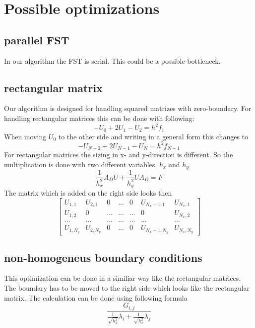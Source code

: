 \documentclass{article}
\begin{document}



\section{Possible optimizations}
\subsection{parallel FST}
In our algorithm the FST is serial. This could be a possible bottleneck.
\subsection{rectangular matrix}
Our algorithm is designed for handling squared matrizes with zero-boundary. For handling rectangular matrices this can be done with following:
\begin{equation}
-U_0+2U_1-U_2=h^2f_1
\end{equation}
When moving $U_0$ to the other side and writing in a general form this changes to
\begin{equation}
-U_{N-2}+2U_{N-1}-U_N=h^2f_{N-1}
\end{equation}
For rectangular matrices the sizing in x- and y-direction is different. So the multiplication is done with two different variables, $h_x$ and $h_y$.
\begin{equation}
\frac{1}{h_x^2}A_DU+\frac{1}{h_y^2}UA_D=F
\end{equation}
The matrix which is added on the right side looks then
$$
\begin{bmatrix}
U_{1,1} & U_{2,1} & 0 & ... & 0 & U_{N_x-1,1} & U_{N_x,1} \\
U_{1,2} & 0 & ... & ... & ... & 0 & U_{N_x,2} \\
... & ... & ... & ... &... & ... & ... \\
U_{1,N_y} & U_{2,N_y} & 0 & ... & 0 & U_{N_x-1,N_y} & U_{N_x,N_y} 
\end{bmatrix}
$$
\subsection{non-homogeneus boundary conditions}
This optimization can be done in a similiar way like the rectangular matrices. The boundary has to be moved to the right side which looks like the rectangular matrix. The calculation can be done using following formula
\begin{equation}
\frac{G_{i,j}}{\frac{1}{\sqrt{h_x^2}}\lambda_i+\frac{1}{\sqrt{h_x^2}}\lambda_j}
\end{equation}
\newpage
\end{document}
